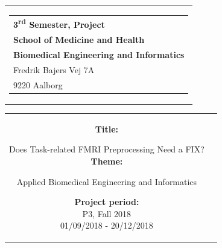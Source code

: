 % 
\thispagestyle{empty}
\begin{titlepage}
	\begin{nopagebreak}
		{\samepage 
			
			\begin{tabular}{r}
				\parbox{\textwidth}{  
					\hfill \hspace{2cm} \parbox{8cm}{\begin{tabular}{l} %
							{\small \textbf{\textcolor{aaublue}{{3\textsuperscript{rd} Semester, Project}}}}\\
							{\small \textbf{\textcolor{aaublue}{School of Medicine and Health}}}\\
							{\small \textbf{\textcolor{aaublue}{Biomedical Engineering and Informatics}}}\\
							{\small \textcolor{aaublue}{Fredrik Bajers Vej 7A}} \\
							{\small \textcolor{aaublue}{9220 Aalborg}} \\
				\end{tabular}}}
			\end{tabular}
			
			\begin{tabular}{cc}
				\parbox{7cm}{
					
					\textbf{Title:}
					
					Does Task-related FMRI Preprocessing Need a FIX? \\ 
					
					\textbf{Theme:}
					
					\small{
						Applied Biomedical Engineering and Informatics\\
					}
					
					
					\parbox{8cm}{
						
						
						\textbf{Project period:}\\
						P3, Fall 2018\\
						01/09/2018 - 20/12/2018\\
						
}}
\end{tabular}}
\end{nopagebreak}
\end{titlepage}
